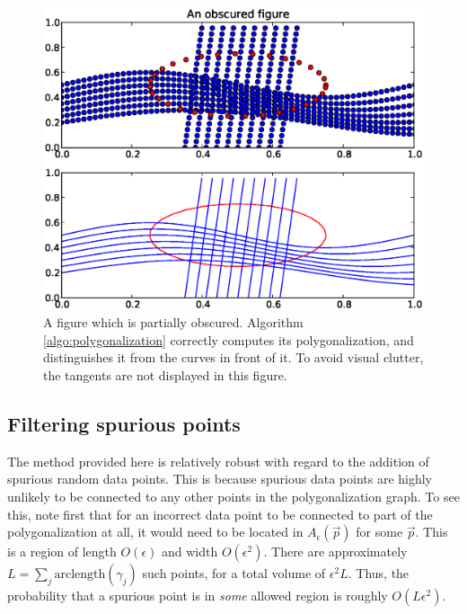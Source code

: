 \documentclass{article}
\numberwithin{cntr}{section}
\numberwithin{equation}{section}
\newcommand{\vp}[0]{{\vec{p}}}
\newcommand{\allowed}[2]{ { A_{#1}(#2) } }
\begin{document}
\begin{figure}
\setlength{\unitlength}{0.240900pt}
\ifx\plotpoint\undefined\newsavebox{\plotpoint}\fi
\sbox{\plotpoint}{\rule[-0.200pt]{0.400pt}{0.400pt}}%
\includegraphics[scale=0.5]{obscured_figure.eps}
\caption{A figure which is partially obscured.
Algorithm \ref{algo:polygonalization} correctly computes its
polygonalization, and distinguishes it from the curves in front of it.
To avoid visual clutter, the tangents are not displayed in this figure.}
\label{fig:obscuredExample}
\end{figure}

\subsection{Filtering spurious points}

The method provided here is relatively robust with regard to the
addition of spurious random data points. This is because spurious data
points are highly unlikely to be connected to any other points in the
polygonalization graph. To see this, note
first that for an incorrect data point to be connected to part of the
polygonalization at all, it would need to be located in
$\allowed{\epsilon}{\vp}$ for some $\vp$.
This is a region of length $O(\epsilon)$ and width $O(\epsilon^{2})$.
There are approximately $L = \sum_{j} \textrm{arclength}(\gamma_{j})$
such points, for a total volume of $\epsilon^{2} L$. Thus, the probability
that a spurious point is in \emph{some} allowed region is roughly
$O(L \epsilon^{2})$.
\end{document}
